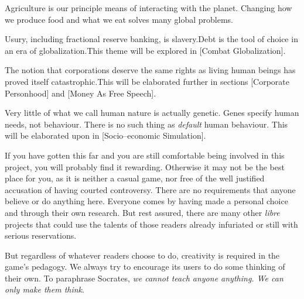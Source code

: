 
Agriculture is our principle means of interacting with the planet. Changing how we produce food and what we eat solves many global problems.\footnotecite[foodwaste]


Usury, including fractional reserve banking, is slavery. Debt is the tool of choice in an era of globalization.\footnotecite[perkins2005] This theme will be explored in [Combat Globalization].


The notion that corporations deserve the same rights as living human beings has proved itself catastrophic. This will be elaborated further in sections \in{}[Corporate Personhood] and \in{}[Money As Free Speech].


Very little of what we call human nature is actually genetic. Genes specify human needs, not behaviour. There is no such thing as {\it default} human behaviour. This will be elaborated upon in [Socio--economic Simulation].
\stopitemize

If you have gotten this far and you are still comfortable being involved in this project, you will probably find it rewarding. Otherwise it may not be the best place for you, as it is neither a casual game, nor free of the well justified accusation of having courted controversy. There are no requirements that anyone believe or do anything here. Everyone comes by having made a personal choice and through their own research. But rest assured, there are many other {\it libre} projects that could use the talents of those readers already infuriated or still with serious reservations.

But regardless of whatever readers choose to do, creativity is required in the game's pedagogy. We always try to encourage its users to do some thinking of their own. To paraphrase Socrates, {\it we cannot teach anyone anything. We can only make them think}.

\StopChapter

